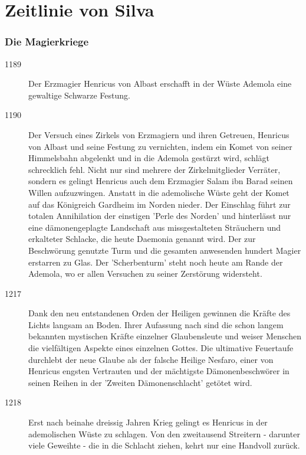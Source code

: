 \documentclass[10pt,twoside,twocolumn,openany]{book}
\begin{document}
\newpage \section{Zeitlinie von Silva}
\begin{multicols}{2}
	
\subsubsection{Die Magierkriege}
\begin{description}
	\item[1189] Der Erzmagier Henricus von Albast erschafft in der Wüste Ademola eine gewaltige Schwarze Festung.
	\item[1190] Der Versuch eines Zirkels von Erzmagiern und ihren Getreuen, Henricus von Albast und seine Festung zu vernichten, indem ein Komet von seiner Himmelsbahn abgelenkt und in die Ademola gestürzt wird, schlägt schrecklich fehl. Nicht nur sind mehrere der Zirkelmitglieder Verräter, sondern es gelingt Henricus auch dem Erzmagier Salam ibn Barad seinen Willen aufzuzwingen. Anstatt in die ademolische Wüste geht der Komet auf das Königreich Gardheim im Norden nieder. Der Einschlag führt zur totalen Annihilation der einstigen 'Perle des Norden' und hinterlässt nur eine dämonengeplagte Landschaft aus missgestalteten Sträuchern und erkalteter Schlacke, die heute Daemonia genannt wird. Der zur Beschwörung genutzte Turm und die gesamten anwesenden hundert Magier erstarren zu Glas. Der 'Scherbenturm' steht noch heute am Rande der Ademola, wo er allen Versuchen zu seiner Zerstörung widersteht.
	\item[1217] Dank den neu entstandenen Orden der Heiligen gewinnen die Kräfte des Lichts langsam an Boden. Ihrer Aufassung nach sind die schon langem bekannten mystischen Kräfte einzelner Glaubensleute und weiser Menschen die vielfältigen Aspekte eines einzelnen Gottes. Die ultimative Feuertaufe durchlebt der neue Glaube als der falsche Heilige Nesfaro, einer von Henricus engsten Vertrauten und der mächtigste Dämonenbeschwörer in seinen Reihen in der 'Zweiten Dämonenschlacht' getötet wird.
	\item[1218] Erst nach beinahe dreissig Jahren Krieg gelingt es Henricus in der ademolischen Wüste zu schlagen. Von den zweitausend Streitern - darunter viele Geweihte  - die in die Schlacht ziehen, kehrt nur eine Handvoll zurück.
\end{description}
	

\end{multicols}
\end{document}
